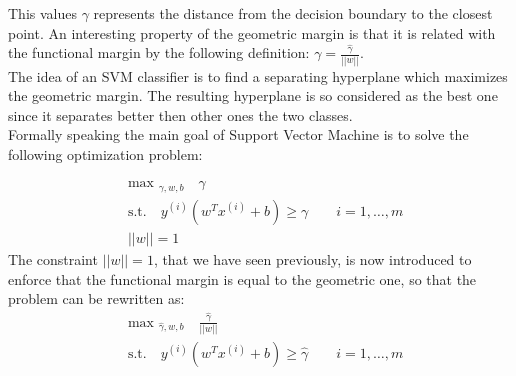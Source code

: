 \documentclass[11pt,a4paper]{article}
\begin{document}
This values $\gamma$ represents the distance from the decision boundary to the closest point. An interesting property of the geometric margin is that it is related with the functional margin by the following definition: $\gamma = \frac{\hat{\gamma}}{||w||}$. \\
The idea of an SVM classifier is to find a separating hyperplane which maximizes the geometric margin. The resulting hyperplane is so considered as the best one since it separates better then other ones the two classes.\\
Formally speaking the main goal of Support Vector Machine is to solve the following optimization problem:

\begin{equation*}
\begin{aligned}
&\text{max }_{\gamma,w,b} \quad \gamma\\
&\text{s.t.} \quad y^{(i)}(w^Tx^{(i)}+b) \geq \gamma \qquad i = 1,\dots, m\\
&||w|| = 1
\end{aligned}
\end{equation*}
The constraint $||w|| = 1$, that we have seen previously, is now introduced to enforce that the functional margin is equal to the geometric one, so that the problem can be rewritten as:
\begin{equation*}
\begin{aligned}
&\text{max }_{\hat{\gamma},w,b} \quad \frac{\hat{\gamma}}{||w||}\\
&\text{s.t.} \quad y^{(i)}(w^Tx^{(i)}+b) \geq \hat{\gamma} \qquad i = 1,\dots, m\\
\end{aligned}
\end{equation*}
\newpage
\end{document}
